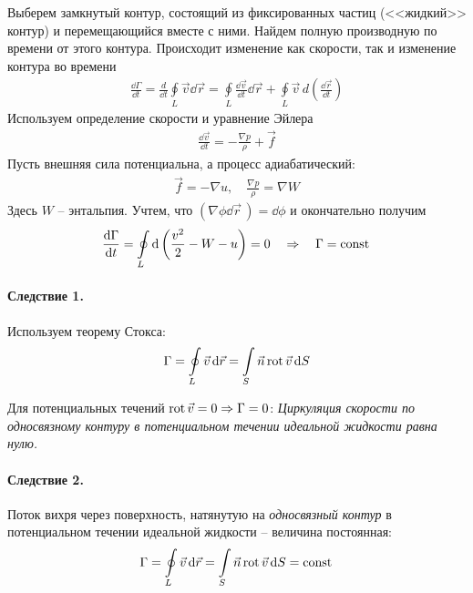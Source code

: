Выберем замкнутый контур, состоящий из фиксированных частиц (<<жидкий>> контур) и перемещающийся вместе с ними.  Найдем полную производную по времени от этого контура. Происходит изменение как скорости, так и изменение контура во времени
\begin{align*}
\frac{\dd \Gamma}{\dd t}=\frac{d}{\dd t} \oint\limits_{L} \vec{v} \dd \vec{r}=\oint\limits_{L} \frac{\dd \vec{v}}{\dd t} \dd \vec{r}+\oint\limits_L \vec{v}\, d\left(\frac{\dd \vec{r}}{\dd t}\right)
\end{align*}
%
Используем определение скорости и уравнение Эйлера
\begin{align*}
\frac { \dd \vec{v}  } { \dd t } = - \frac { \nabla p } { \rho } + \vec { f }
\end{align*}
%
Пусть внешняя сила потенциальна, а процесс адиабатический:
\begin{align*}
{ \vec { f } = - \nabla u }, \quad
{ \frac { \nabla p } { \rho } = \nabla W }
\end{align*}
Здесь $W$ -- энтальпия.  Учтем, что $ ( \nabla \phi \dd{\vec{r}}\, ) = \dd \phi $ и окончательно получим
\begin{align*}
\frac { \dd \Gamma } { \dd t } = \oint\limits _ { L } \dd \left( \frac { v ^ { 2 } } { 2 } - W - u \right) = 0 \quad \Rightarrow \quad  \Gamma = \mathrm{const}\,
\end{align*}

\paragraph{Следствие 1.} Используем теорему Стокса:
\begin{align*}
\Gamma = \oint \limits_ { L } \vec{v} \dd{\vec{r}} = \int \limits_ { S } \vec { n }\operatorname{rot}\vec{v}\dd{S}
\end{align*}

Для потенциальных течений $ \operatorname{rot} \vec{v} = 0 \Rightarrow \Gamma = 0$: \textit{Циркуляция скорости по {односвязному контуру} в потенциальном течении идеальной жидкости равна нулю.}

\paragraph{Следствие 2.} 	Поток вихря через поверхность, натянутую на  \textit{односвязный контур} в потенциальном течении идеальной жидкости -- величина постоянная:
	\begin{align*}
	\Gamma = \oint \limits_ { L } \vec{v} \dd{\vec{r}} = \int \limits_ { S } \vec { n }  \operatorname{rot} \vec{v}\dd{S} = \mathrm{const}\,
	\end{align*}


